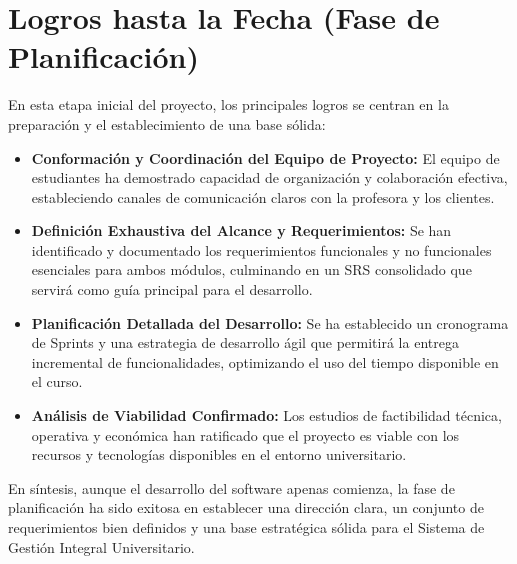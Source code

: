 \section{Logros hasta la Fecha (Fase de Planificación)}

En esta etapa inicial del proyecto, los principales logros se centran en la preparación y el establecimiento de una base sólida:

\begin{itemize}
    \item \textbf{Conformación y Coordinación del Equipo de Proyecto:} El equipo de estudiantes ha demostrado capacidad de organización y colaboración efectiva, estableciendo canales de comunicación claros con la profesora y los clientes.

    \item \textbf{Definición Exhaustiva del Alcance y Requerimientos:} Se han identificado y documentado los requerimientos funcionales y no funcionales esenciales para ambos módulos, culminando en un SRS consolidado que servirá como guía principal para el desarrollo.

    \item \textbf{Planificación Detallada del Desarrollo:} Se ha establecido un cronograma de Sprints y una estrategia de desarrollo ágil que permitirá la entrega incremental de funcionalidades, optimizando el uso del tiempo disponible en el curso.

    \item \textbf{Análisis de Viabilidad Confirmado:} Los estudios de factibilidad técnica, operativa y económica han ratificado que el proyecto es viable con los recursos y tecnologías disponibles en el entorno universitario.
\end{itemize}

En síntesis, aunque el desarrollo del software apenas comienza, la fase de planificación ha sido exitosa en establecer una dirección clara, un conjunto de requerimientos bien definidos y una base estratégica sólida para el Sistema de Gestión Integral Universitario.